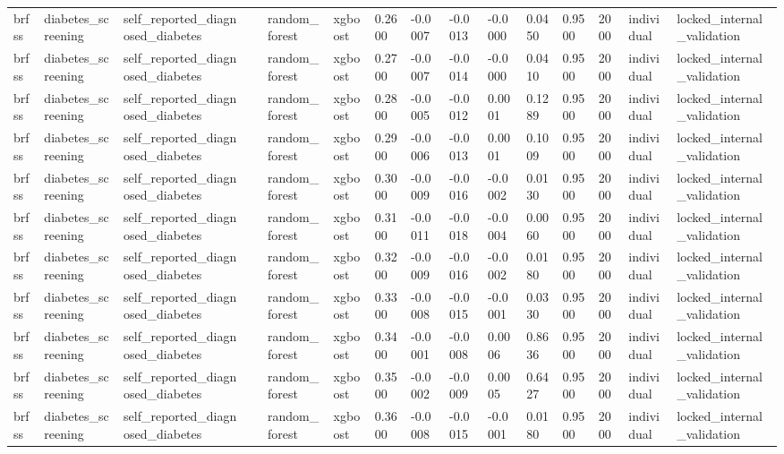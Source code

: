 \begin{tabular}{lllllllllllllll}
brfss & diabetes\_screening & self\_reported\_diagnosed\_diabetes &  & random\_forest & xgboost & 0.2600 & -0.0007 & -0.0013 & -0.0000 & 0.0450 & 0.9500 & 2000 & individual & locked\_internal\_validation \\
brfss & diabetes\_screening & self\_reported\_diagnosed\_diabetes &  & random\_forest & xgboost & 0.2700 & -0.0007 & -0.0014 & -0.0000 & 0.0410 & 0.9500 & 2000 & individual & locked\_internal\_validation \\
brfss & diabetes\_screening & self\_reported\_diagnosed\_diabetes &  & random\_forest & xgboost & 0.2800 & -0.0005 & -0.0012 & 0.0001 & 0.1289 & 0.9500 & 2000 & individual & locked\_internal\_validation \\
brfss & diabetes\_screening & self\_reported\_diagnosed\_diabetes &  & random\_forest & xgboost & 0.2900 & -0.0006 & -0.0013 & 0.0001 & 0.1009 & 0.9500 & 2000 & individual & locked\_internal\_validation \\
brfss & diabetes\_screening & self\_reported\_diagnosed\_diabetes &  & random\_forest & xgboost & 0.3000 & -0.0009 & -0.0016 & -0.0002 & 0.0130 & 0.9500 & 2000 & individual & locked\_internal\_validation \\
brfss & diabetes\_screening & self\_reported\_diagnosed\_diabetes &  & random\_forest & xgboost & 0.3100 & -0.0011 & -0.0018 & -0.0004 & 0.0060 & 0.9500 & 2000 & individual & locked\_internal\_validation \\
brfss & diabetes\_screening & self\_reported\_diagnosed\_diabetes &  & random\_forest & xgboost & 0.3200 & -0.0009 & -0.0016 & -0.0002 & 0.0180 & 0.9500 & 2000 & individual & locked\_internal\_validation \\
brfss & diabetes\_screening & self\_reported\_diagnosed\_diabetes &  & random\_forest & xgboost & 0.3300 & -0.0008 & -0.0015 & -0.0001 & 0.0330 & 0.9500 & 2000 & individual & locked\_internal\_validation \\
brfss & diabetes\_screening & self\_reported\_diagnosed\_diabetes &  & random\_forest & xgboost & 0.3400 & -0.0001 & -0.0008 & 0.0006 & 0.8636 & 0.9500 & 2000 & individual & locked\_internal\_validation \\
brfss & diabetes\_screening & self\_reported\_diagnosed\_diabetes &  & random\_forest & xgboost & 0.3500 & -0.0002 & -0.0009 & 0.0005 & 0.6427 & 0.9500 & 2000 & individual & locked\_internal\_validation \\
brfss & diabetes\_screening & self\_reported\_diagnosed\_diabetes &  & random\_forest & xgboost & 0.3600 & -0.0008 & -0.0015 & -0.0001 & 0.0180 & 0.9500 & 2000 & individual & locked\_internal\_validation \\

\end{tabular}
